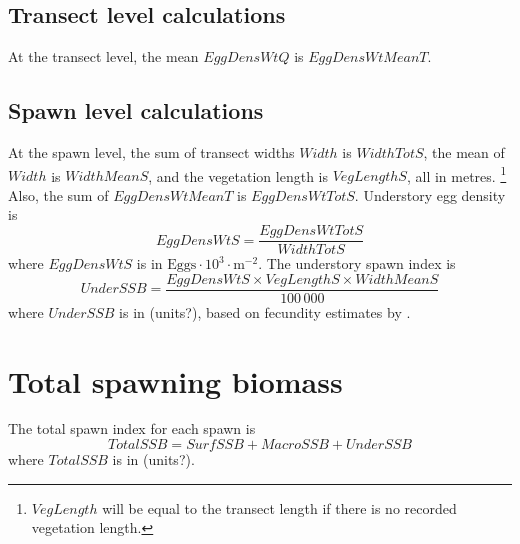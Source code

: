 \documentclass[12pt]{article}
\begin{document}
\subsection{Transect level calculations}

At the transect level, the mean $EggDensWtQ$ is $EggDensWtMeanT$.

\subsection{Spawn level calculations}

At the spawn level, the sum of transect widths $Width$ is $WidthTotS$, the mean of $Width$ is $WidthMeanS$, and the vegetation length is $VegLengthS$, all in metres.%
\footnote{$VegLength$ will be equal to the transect length if there is no recorded vegetation length.} 
Also, the sum of $EggDensWtMeanT$ is $EggDensWtTotS$.
Understory egg density is 
\begin{equation}
EggDensWtS = \frac{EggDensWtTotS} {WidthTotS}
\label{eqEggDensityUnder}
\end{equation}
where $EggDensWtS$ is in $\text{Eggs} \cdot 10^{3} \cdot \text{m}^{-2}$.
The understory spawn index is
\begin{equation}
UnderSSB = \frac{EggDensWtS \times VegLengthS \times WidthMeanS} {100\,000}
\label{eqBiomassUnder}
\end{equation}
where $UnderSSB$ is in (units?), based on fecundity estimates by \citet{Hay1985}.

\section{Total spawning biomass}

The total spawn index for each spawn is
\begin{equation}
TotalSSB = SurfSSB + MacroSSB + UnderSSB
\label{eqTotalSSB}
\end{equation}
where $TotalSSB$ is in (units?).



\end{document}
